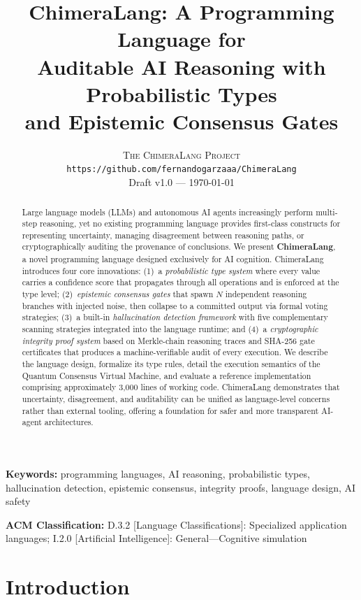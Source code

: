 \documentclass[11pt,a4paper]{article}
\title{%
  \textbf{ChimeraLang: A Programming Language for\\
  Auditable AI Reasoning with Probabilistic Types\\
  and Epistemic Consensus Gates}%
}
\author{%
  \textsc{The ChimeraLang Project}\\[4pt]
  \texttt{https://github.com/fernandogarzaaa/ChimeraLang}\\[12pt]
  \small Draft v1.0 --- \today
}
\date{}
\begin{document}
\maketitle

\begin{abstract}
Large language models (LLMs) and autonomous AI agents increasingly perform
multi-step reasoning, yet no existing programming language provides first-class
constructs for representing uncertainty, managing disagreement between reasoning
paths, or cryptographically auditing the provenance of conclusions. We present
\textbf{ChimeraLang}, a novel programming language designed exclusively for AI
cognition. ChimeraLang introduces four core innovations:
(1)~a \emph{probabilistic type system} where every value carries a confidence
score that propagates through all operations and is enforced at the type level;
(2)~\emph{epistemic consensus gates} that spawn $N$ independent reasoning
branches with injected noise, then collapse to a committed output via formal
voting strategies;
(3)~a built-in \emph{hallucination detection framework} with five
complementary scanning strategies integrated into the language runtime; and
(4)~a \emph{cryptographic integrity proof system} based on Merkle-chain
reasoning traces and SHA-256 gate certificates that produces a machine-verifiable
audit of every execution.
We describe the language design, formalize its type rules, detail the execution
semantics of the Quantum Consensus Virtual Machine, and evaluate a reference
implementation comprising approximately 3{,}000 lines of working code.
ChimeraLang demonstrates that uncertainty, disagreement, and auditability can be
unified as language-level concerns rather than external tooling, offering a
foundation for safer and more transparent AI-agent architectures.
\end{abstract}

\vspace{6pt}
\noindent\textbf{Keywords:}
programming languages, AI reasoning, probabilistic types, hallucination detection,
epistemic consensus, integrity proofs, language design, AI safety

\vspace{4pt}
\noindent\textbf{ACM Classification:}
D.3.2 [Language Classifications]: Specialized application languages;
I.2.0 [Artificial Intelligence]: General---Cognitive simulation

\section{Introduction}
\label{sec:intro}
\end{document}

